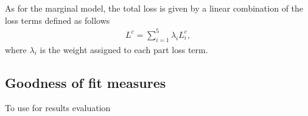 As for the marginal model, the total loss is given by a linear combination of the loss terms defined as follows
\begin{align*}
    L^c = \sum_{i=1}^5 \lambda_i L_i^c,
\end{align*}
where $\lambda_i$ is the weight assigned to each part loss term. 





\subsection{Goodness of fit measures}
To use for results evaluation